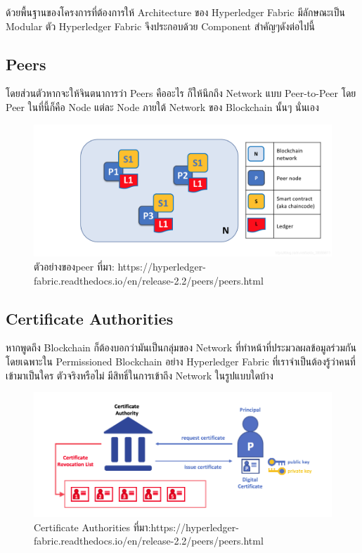 ด้วยพื้นฐานของโครงการที่ต้องการให้ Architecture ของ Hyperledger Fabric มีลักษณะเป็น Modular ตัว Hyperledger Fabric จึงประกอบด้วย Component สำคัญๆดังต่อไปนี้
\subsection{Peers}
 โดยส่วนตัวหากจะให้จินตนาการว่า Peers คืออะไร ก็ให้นึกถึง Network แบบ Peer-to-Peer โดย Peer ในที่นี้ก็คือ Node แต่ละ Node ภายใต้ Network ของ Blockchain นั้นๆ นั่นเอง

 \begin{figure}[htbp]
   \centering 
   \includegraphics[scale=0.3]{peer.png}
   \caption[Peer]{ตัวอย่างของpeer
   ที่มา: https://hyperledger-fabric.readthedocs.io/en/release-2.2/peers/peers.html}
   \label{fig:Peer}
 \end{figure}



\subsection{Certificate Authorities}
หากพูดถึง Blockchain ก็ต้องบอกว่ามันเป็นกลุ่มของ Network ที่ทำหน้าที่ประมวลผลข้อมูลร่วมกัน โดยเฉพาะใน Permissioned Blockchain อย่าง Hyperledger Fabric ที่เราจำเป็นต้องรู้ว่าคนที่เข้ามาเป็นใคร ตัวจริงหรือไม่ มีสิทธิ์ในการเข้าถึง Network ในรูปแบบใดบ้าง

\begin{figure}[htbp]
  \centering 
  \includegraphics[scale=0.3]{certifi.png}
  \caption[Certificate Authorities]{Certificate Authorities
  ที่มา:https://hyperledger-fabric.readthedocs.io/en/release-2.2/peers/peers.html}
  \label{fig:Certificate}
\end{figure}


